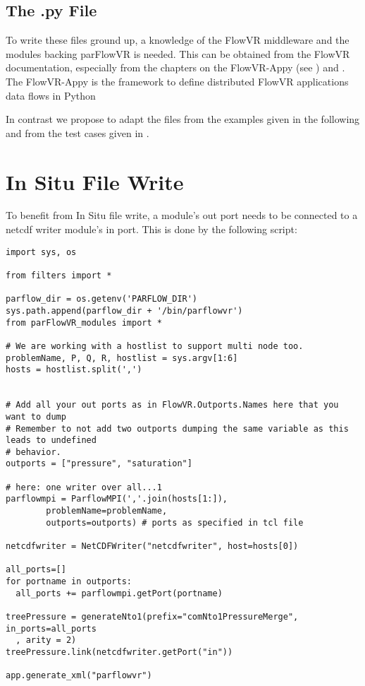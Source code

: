 \subsection{The .py File}
To write these files ground up, a knowledge of the FlowVR middleware and the modules backing
parFlowVR is needed. This can be obtained from the FlowVR documentation, especially from
the chapters on the FlowVR-Appy (see )
and \cite{thesisFriedemann2018}. The FlowVR-Appy is the framework to define distributed
FlowVR applications data flows in Python

In contrast we propose to adapt the  files from the examples given in the following
and from the test cases given in .
\section{In Situ File Write}
To benefit from In Situ file write, a \parflow{} module's out port needs to be connected to
a netcdf writer module's in port. This is done by the following  script:

\begin{display}\begin{verbatim}
import sys, os

from filters import *

parflow_dir = os.getenv('PARFLOW_DIR')
sys.path.append(parflow_dir + '/bin/parflowvr')
from parFlowVR_modules import *

# We are working with a hostlist to support multi node too.
problemName, P, Q, R, hostlist = sys.argv[1:6]
hosts = hostlist.split(',')


# Add all your out ports as in FlowVR.Outports.Names here that you want to dump
# Remember to not add two outports dumping the same variable as this leads to undefined
# behavior.
outports = ["pressure", "saturation"]

# here: one writer over all...1
parflowmpi = ParflowMPI(','.join(hosts[1:]),
        problemName=problemName,
        outports=outports) # ports as specified in tcl file

netcdfwriter = NetCDFWriter("netcdfwriter", host=hosts[0])

all_ports=[]
for portname in outports:
  all_ports += parflowmpi.getPort(portname)

treePressure = generateNto1(prefix="comNto1PressureMerge", in_ports=all_ports
  , arity = 2)
treePressure.link(netcdfwriter.getPort("in"))

app.generate_xml("parflowvr")
\end{verbatim}\end{display}

